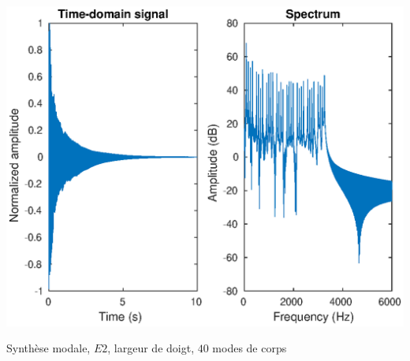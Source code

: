 \begin{table}[hpbt]
\centering
\includegraphics[scale=0.8]{figures/modal_synthesis-E2-40_string_modes-15_body_modes-finger_pluck.eps}
 \caption{Synthèse modale, \( E2 \), largeur de doigt, \( 40 \) modes de corps
 \label{fig:synth:modal_synth}}
\end{table}

% 
